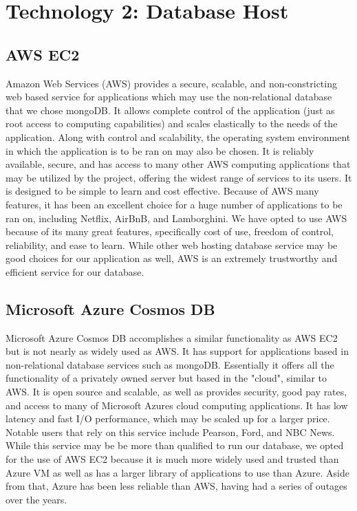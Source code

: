 \documentclass[onecolumn, draftclsnofoot,10pt, compsoc]{IEEEtran}
\begin{document}
\section{Technology 2: Database Host}

	\subsection{AWS EC2}
	
		Amazon Web Services (AWS) provides a secure, scalable, and non-constricting web based service for applications which may use the non-relational database that we chose mongoDB. It allows complete control of the application (just as root access 
		to computing capabilities) and scales elastically to the needs of the application. Along with control and scalability, the operating system environment in which the application
		is to be ran on may also be chosen. It is reliably available, secure, and has access to many other AWS computing applications that may be utilized by the project, offering the widest
		range of services to its users. It is designed to be simple to learn and cost effective. Because of AWS many features, it has been an excellent choice for a huge number of applications to be ran on, including
		Netflix, AirBnB, and Lamborghini. We have opted to use AWS because of its many great features, specifically cost of use, freedom of control, reliability, and ease to learn. 
		While other web hosting database service may be good choices for our application as well, AWS is an extremely trustworthy and efficient service for our database.
	
	\subsection{Microsoft Azure Cosmos DB}
	
		Microsoft Azure Cosmos DB accomplishes a similar functionality as AWS EC2 but is not nearly as widely used as AWS. It has support for applications based in
		non-relational database services such as mongoDB. Essentially it offers all the functionality of a privately owned server but based in the "cloud", similar to AWS.
		It is open source and scalable, as well as provides security, good pay rates, and access to many of Microsoft Azures cloud computing applications. It has low latency and fast
		I/O performance, which may be scaled up for a larger price. Notable users that rely on this service include Pearson, Ford, and NBC News. While this service may be
		be more than qualified to run our database, we opted for the use of AWS EC2 because it is much more widely used and trusted than Azure VM as well as has a larger library
		of applications to use than Azure. Aside from that, Azure has been less reliable than AWS, having had a series of outages over the years.
	
\end{document}
